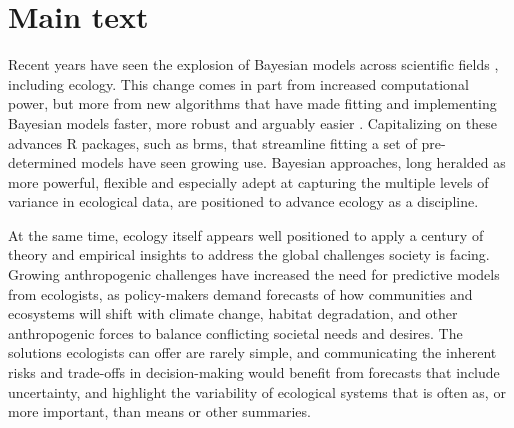 \documentclass[11pt]{article}
\begin{document}
{\section{Main text}
\setlength{\parindent}{0pt}
\setlength{\parskip}{7pt}

Recent years have seen the explosion of Bayesian models across scientific fields \citep{vandeschoot2021,schad2021,grinsztajn2021}, including ecology. This change comes in part from increased computational power, but more from new algorithms \citep[e.g. Hamiltonian Monte Carlo,][]{nuts2014,betan2019} that have made fitting and implementing Bayesian models faster, more robust and arguably easier \citep{Carpenter:2017stan}. Capitalizing on these advances \textsf{R} packages, such as \textsf{brms}, that streamline fitting a set of pre-determined models have seen growing use. Bayesian approaches, long heralded as more powerful, flexible and especially adept at capturing the multiple levels of variance in ecological data, are positioned to advance ecology as a discipline. %

 
At the same time, ecology itself appears well positioned to apply a century of theory and empirical insights to address the global challenges society is facing. Growing anthropogenic challenges have increased the need for predictive models from ecologists, as policy-makers demand forecasts of how communities and ecosystems will shift with climate change, habitat degradation, and other anthropogenic forces to balance conflicting societal needs and desires. The solutions ecologists can offer are rarely simple, and communicating the inherent risks and trade-offs in decision-making would benefit from forecasts that include uncertainty, and highlight the variability of ecological systems that is often as, or more important, than means or other summaries. %

}
\end{document}

